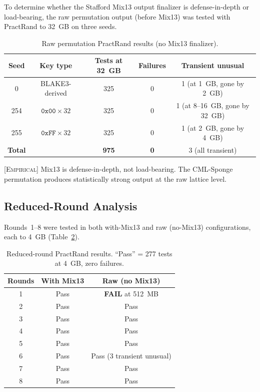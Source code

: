 \documentclass[runningheads]{llncs}
\newcommand{\empirical}[1]{\textsc{[Empirical]} #1}
\begin{document}
To determine whether the Stafford Mix13 output finalizer is defense-in-depth
or load-bearing, the raw permutation output (before Mix13) was tested with
PractRand to 32~GB on three seeds.

\begin{table}[h]
\centering
\caption{Raw permutation PractRand results (no Mix13 finalizer).}
\label{tab:practrand-raw}
\begin{tabular}{@{}ccccc@{}}
\toprule
Seed & Key type & Tests at 32~GB & Failures & Transient unusual \\
\midrule
0 & BLAKE3-derived & 325 & 0 & 1 (at 1~GB, gone by 2~GB) \\
254 & $\texttt{0x00} \times 32$ & 325 & 0 & 1 (at 8--16~GB, gone by 32~GB) \\
255 & $\texttt{0xFF} \times 32$ & 325 & 0 & 1 (at 2~GB, gone by 4~GB) \\
\midrule
\textbf{Total} & & \textbf{975} & \textbf{0} & 3 (all transient) \\
\bottomrule
\end{tabular}
\end{table}

\empirical{Mix13 is defense-in-depth, not load-bearing.  The CML-Sponge
permutation produces statistically strong output at the raw lattice level.}

\subsection{Reduced-Round Analysis}

Rounds~1--8 were tested in both with-Mix13 and raw (no-Mix13) configurations,
each to 4~GB (Table~\ref{tab:reduced-round}).

\begin{table}[h]
\centering
\caption{Reduced-round PractRand results.  ``Pass'' = 277 tests at 4~GB, zero failures.}
\label{tab:reduced-round}
\begin{tabular}{@{}ccc@{}}
\toprule
Rounds & With Mix13 & Raw (no Mix13) \\
\midrule
1 & Pass & \textbf{FAIL} at 512~MB \\
2 & Pass & Pass \\
3 & Pass & Pass \\
4 & Pass & Pass \\
5 & Pass & Pass \\
6 & Pass & Pass (3 transient unusual) \\
7 & Pass & Pass \\
8 & Pass & Pass \\
\bottomrule
\end{tabular}
\end{table}
\end{document}

